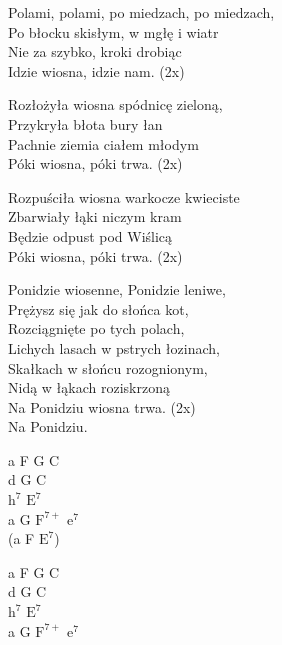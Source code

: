 \begin{text}
    Polami, polami, po miedzach, po miedzach,\\
    Po błocku skisłym, w mgłę i wiatr\\
    Nie za szybko, kroki drobiąc\\
    Idzie wiosna, idzie nam. (2x)

    \chordfill
    Rozłożyła wiosna spódnicę zieloną,\\
    Przykryła błota bury łan\\
    Pachnie ziemia ciałem młodym\\
    Póki wiosna, póki trwa. (2x)

    \chordfill
    Rozpuściła wiosna warkocze kwieciste\\
    Zbarwiały łąki niczym kram\\
    Będzie odpust pod Wiślicą\\
    Póki wiosna, póki trwa. (2x)

    Ponidzie wiosenne, Ponidzie leniwe,\\
    Prężysz się jak do słońca kot,\\
    Rozciągnięte po tych polach,\\
    Lichych lasach w pstrych łozinach,\\
    Skałkach w słońcu rozognionym,\\
    Nidą w łąkach roziskrzoną\\
    Na Ponidziu wiosna trwa. (2x)\\
    Na Ponidziu.
\end{text}
\begin{chord}
    a F G C\\
    d G C\\
    $\mathrm{h^7}$ $\mathrm{E^7}$\\
    a G $\mathrm{F^{7+}}$ $\mathrm{e^7}$\\
    (a F $\mathrm{E^7}$)

    a F G C\\
    d G C\\
    $\mathrm{h^7}$ $\mathrm{E^7}$\\
    a G $\mathrm{F^{7+}}$ $\mathrm{e^7}$
\end{chord}
